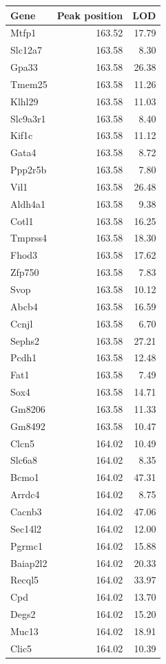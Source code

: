\documentclass[oneside]{book}\usepackage[]{graphicx}\usepackage[]{color}
\begin{document}
\begin{appendices}
{\begin{longtable}{lrr}
Gene & Peak position & LOD \\
  \hline
Mtfp1 & 163.52 & 17.79 \\
  Slc12a7 & 163.58 & 8.30 \\
  Gpa33 & 163.58 & 26.38 \\
  Tmem25 & 163.58 & 11.26 \\
  Klhl29 & 163.58 & 11.03 \\
  Slc9a3r1 & 163.58 & 8.40 \\
  Kif1c & 163.58 & 11.12 \\
  Gata4 & 163.58 & 8.72 \\
  Ppp2r5b & 163.58 & 7.80 \\
  Vil1 & 163.58 & 26.48 \\
  Aldh4a1 & 163.58 & 9.38 \\
  Cotl1 & 163.58 & 16.25 \\
  Tmprss4 & 163.58 & 18.30 \\
  Fhod3 & 163.58 & 17.62 \\
  Zfp750 & 163.58 & 7.83 \\
  Svop & 163.58 & 10.12 \\
  Abcb4 & 163.58 & 16.59 \\
  Ccnjl & 163.58 & 6.70 \\
  Sephs2 & 163.58 & 27.21 \\
  Pcdh1 & 163.58 & 12.48 \\
  Fat1 & 163.58 & 7.49 \\
  Sox4 & 163.58 & 14.71 \\
  Gm8206 & 163.58 & 11.33 \\
  Gm8492 & 163.58 & 10.47 \\
  Clcn5 & 164.02 & 10.49 \\
  Slc6a8 & 164.02 & 8.35 \\
  Bcmo1 & 164.02 & 47.31 \\
  Arrdc4 & 164.02 & 8.75 \\
  Cacnb3 & 164.02 & 47.06 \\
  Sec14l2 & 164.02 & 12.00 \\
  Pgrmc1 & 164.02 & 15.88 \\
  Baiap2l2 & 164.02 & 20.33 \\
  Recql5 & 164.02 & 33.97 \\
  Cpd & 164.02 & 13.70 \\
  Degs2 & 164.02 & 15.20 \\
  Muc13 & 164.02 & 18.91 \\
  Clic5 & 164.02 & 10.39 \\

\end{longtable}}
\end{appendices}
\end{document}
